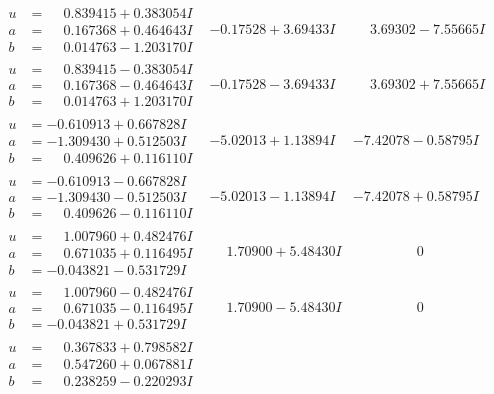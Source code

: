 \documentclass[1p]{elsarticle_modified}
\theoremstyle{definition}
\begin{document}
$$\begin{array}{c|c|c}
\begin{aligned}
u &= \phantom{-}0.839415 + 0.383054 I \\
a &= \phantom{-}0.167368 + 0.464643 I \\
b &= \phantom{-}0.014763 - 1.203170 I\end{aligned}
 & -0.17528 + 3.69433 I & \phantom{-}3.69302 - 7.55665 I \\ \hline\begin{aligned}
u &= \phantom{-}0.839415 - 0.383054 I \\
a &= \phantom{-}0.167368 - 0.464643 I \\
b &= \phantom{-}0.014763 + 1.203170 I\end{aligned}
 & -0.17528 - 3.69433 I & \phantom{-}3.69302 + 7.55665 I \\ \hline\begin{aligned}
u &= -0.610913 + 0.667828 I \\
a &= -1.309430 + 0.512503 I \\
b &= \phantom{-}0.409626 + 0.116110 I\end{aligned}
 & -5.02013 + 1.13894 I & -7.42078 - 0.58795 I \\ \hline\begin{aligned}
u &= -0.610913 - 0.667828 I \\
a &= -1.309430 - 0.512503 I \\
b &= \phantom{-}0.409626 - 0.116110 I\end{aligned}
 & -5.02013 - 1.13894 I & -7.42078 + 0.58795 I \\ \hline\begin{aligned}
u &= \phantom{-}1.007960 + 0.482476 I \\
a &= \phantom{-}0.671035 + 0.116495 I \\
b &= -0.043821 - 0.531729 I\end{aligned}
 & \phantom{-}1.70900 + 5.48430 I & \phantom{-0.000000 } 0 \\ \hline\begin{aligned}
u &= \phantom{-}1.007960 - 0.482476 I \\
a &= \phantom{-}0.671035 - 0.116495 I \\
b &= -0.043821 + 0.531729 I\end{aligned}
 & \phantom{-}1.70900 - 5.48430 I & \phantom{-0.000000 } 0 \\ \hline\begin{aligned}
u &= \phantom{-}0.367833 + 0.798582 I \\
a &= \phantom{-}0.547260 + 0.067881 I \\
b &= \phantom{-}0.238259 - 0.220293 I\end{aligned}

\end{array}$$
\end{document}
